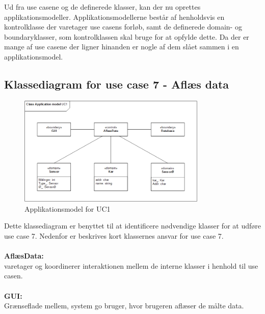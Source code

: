 Ud fra use casene og de definerede klasser, kan der nu oprettes applikationsmodeller. Applikationsmodellerne
består af henholdsvis en kontrolklasse der varetager use casens forløb, samt de definerede domain-
og boundaryklasser, som kontrolklassen skal bruge for at opfylde dette. Da der er mange af use casene der ligner hinanden er nogle af dem slået sammen i en applikationsmodel. 


\subsection{Klassediagram for use case 7 - Aflæs data}

\begin{figure}[H]
    \centering
    \includegraphics[width=0.8\textwidth]{Systemarkitektur/KlasseDiagrammer/7_AflaesData.png}
    \caption{Applikationsmodel for UC1}
    \label{fig:app_uc7}
\end{figure}

Dette klassediagram er benyttet til at identificere nødvendige klasser for at udføre use case 7.
Nedenfor er beskrives kort klassernes ansvar for use case 7.
\\\\
\textbf{AflæsData:}\\
varetager og koordinerer interaktionen mellem de interne klasser i henhold til use casen.
\\\\
\textbf{GUI:}\\
Grænseflade mellem, system go bruger, hvor brugeren aflæser de målte data. 
\\\\

